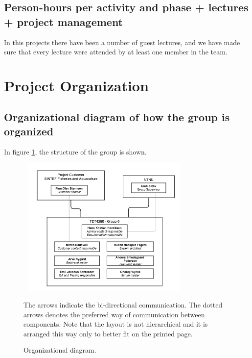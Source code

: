 \documentclass[11pt,a4paper,titlepage,oneside]{report}
\begin{document}
\subsection{Person-hours per activity and phase + lectures + project management}
In this projects there have been a number of guest lectures, and we have made sure that every lecture were attended by at least one member in the team.

\section{Project Organization}
\subsection{Organizational diagram of how the group is organized}
In figure \ref{fig:organizational-structure}, the structure of the group is shown. 

\begin{figure}[h]
\begin{center}
\includegraphics[height=260px,width=328px]{img/tdt4290_group_6_organizational_structure.png}
\caption{Organizational diagram.}
\label{fig:organizational-structure}
\medskip
\small
The arrows indicate the bi-directional communication. The dotted arrows denotes the preferred way of communication between components. Note that the layout is not hierarchical and it is arranged this way only to better fit on the printed page.
\end{center}
\end{figure}
\end{document}
